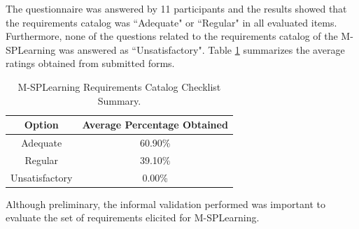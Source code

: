 
The questionnaire was answered by 11 participants and the results showed that the requirements catalog was ``Adequate" or ``Regular" in all evaluated items. Furthermore, none of the questions related to the requirements catalog of the M-SPLearning was answered as ``Unsatisfactory". Table \ref{tableMSPLChecklist} summarizes the average ratings obtained from submitted forms.

\begin{table}
    \caption{M-SPLearning Requirements Catalog Checklist Summary.}
    \centering
    \scriptsize
    \begin{tabular}{cc}
        \toprule
        \textbf{Option} & \textbf{Average Percentage Obtained} \\
        \midrule
        Adequate       & 60.90\% \\
        Regular        & 39.10\% \\
        Unsatisfactory & 0.00\% \\
        \bottomrule
    \end{tabular}
    \label{tableMSPLChecklist}
\end{table}

Although preliminary, the informal validation performed was important to evaluate the set of requirements elicited for M-SPLearning.

